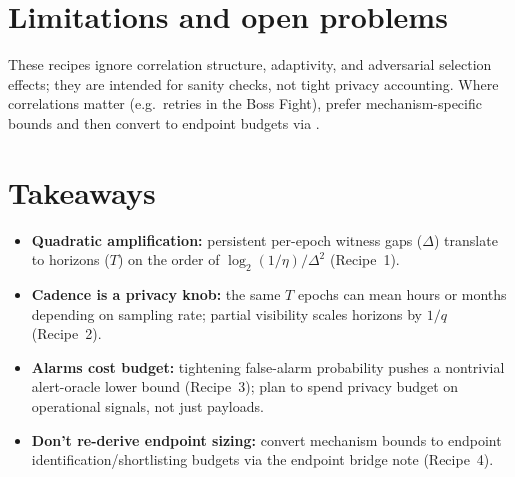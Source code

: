 \documentclass[11pt]{article}
\begin{document}
\section{Limitations and open problems}
These recipes ignore correlation structure, adaptivity, and adversarial selection effects; they are intended for sanity checks, not tight privacy accounting.
Where correlations matter (e.g.\ retries in the Boss Fight), prefer mechanism-specific bounds and then convert to endpoint budgets via \cite{synth5}.

\section{Takeaways}
\begin{itemize}[leftmargin=*]
\item \textbf{Quadratic amplification:} persistent per-epoch witness gaps ($\Delta$) translate to horizons ($T$) on the order of $\log_2(1/\eta)/\Delta^2$ (Recipe~1).
\item \textbf{Cadence is a privacy knob:} the same $T$ epochs can mean hours or months depending on sampling rate; partial visibility scales horizons by $1/q$ (Recipe~2).
\item \textbf{Alarms cost budget:} tightening false-alarm probability pushes a nontrivial alert-oracle lower bound (Recipe~3); plan to spend privacy budget on operational signals, not just payloads.
\item \textbf{Don't re-derive endpoint sizing:} convert mechanism bounds to endpoint identification/shortlisting budgets via the endpoint bridge note (Recipe~4).
\end{itemize}
\end{document}
